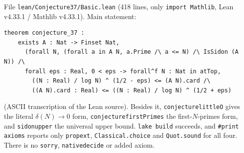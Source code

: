 \documentclass[11pt]{article}
\theoremstyle{definition}
\theoremstyle{remark}
\renewcommand{\_}{\oldus\allowbreak}
\begin{document}
File \texttt{lean/Conjecture37/Basic.lean} (418 lines, only \texttt{import Mathlib}, Lean
v4.33.1 / Mathlib v4.33.1). Main statement:
\begin{verbatim}
theorem conjecture_37 :
    exists A : Nat -> Finset Nat,
      (forall N, (forall a in A N, a.Prime /\ a <= N) /\ IsSidon (A N)) /\
      forall eps : Real, 0 < eps -> forall^f N : Nat in atTop,
        ((N : Real) / log N) ^ (1/2 - eps) <= (A N).card /\
        ((A N).card : Real) <= ((N : Real) / log N) ^ (1/2 + eps)
\end{verbatim}
(ASCII transcription of the Lean source). Besides it, \texttt{conjecture\_37\_littleO} gives the literal
$\delta(N)\to0$ form, \texttt{conjecture\_37\_firstPrimes} the first-$N$-primes form, and
\texttt{sidon\_upper} the universal upper bound. \texttt{lake build} succeeds, and \texttt{\#print axioms}
reports only \texttt{propext}, \texttt{Classical.choice} and \texttt{Quot.sound} for all four. There is no
\texttt{sorry}, \texttt{native\_decide} or added axiom.
\end{document}
